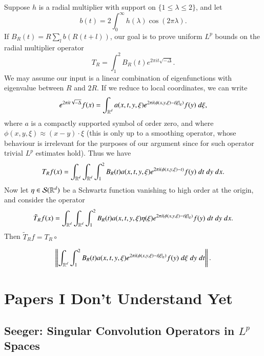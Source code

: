 Suppose $h$ is a radial multiplier with support on $\{ 1 \leq \lambda \leq 2 \}$, and let
%
\[ b(t) = 2 \int_0^\infty h(\lambda) \cos(2 \pi \lambda). \]
%
If $B_R(t) = R \sum_l b(R(t + l))$, our goal is to prove uniform $L^p$ bounds on the radial multiplier operator
%
\[ T_R = \int_1^2 B_R(t) e^{2 \pi i t \sqrt{-\Delta}}. \]
%
We may assume our input is a linear combination of eigenfunctions with eigenvalue between $R$ and $2R$. If we reduce to local coordinates, we can write
%
\[ e^{2 \pi i t \sqrt{-\Delta}} f(x) = \int_{\operatorname{\mathbb{R}}^d} a(x,t,y,\xi) e^{2 \pi i (\phi(x,y,\xi) - t |\xi|_g)} f(y)\; d\xi, \]
%
where $a$ is a compactly supported symbol of order zero, and where $\phi(x,y,\xi) \approx (x - y) \cdot \xi$ (this is only up to a smoothing operator, whose behaviour is irrelevant for the purposes of our argument since for such operator trivial $L^p$ estimates hold). Thus we have
%
\[ T_R f(x) = \int_{\operatorname{\mathbb{R}}^d} \int_{\operatorname{\mathbb{R}}^d} \int_1^2 B_R(t) a(x,t,y,\xi) e^{2 \pi i (\phi(x,y,\xi) - t)} f(y)\; dt\; dy\; dx. \]
%
Now let $\eta \in \mathcal{S}(\operatorname{\mathbb{R}}^d)$ be a Schwartz function vanishing to high order at the origin, and consider the operator
%
\[ \tilde{T}_R f(x) = \int_{\operatorname{\mathbb{R}}^d} \int_{\operatorname{\mathbb{R}}^d} \int_1^2 B_R(t) a(x,t,y,\xi) \eta( \xi ) e^{2 \pi i (\phi(x,y,\xi) - t |\xi|_g)} f(y)\; dt\; dy\; dx. \]
%
Then $\tilde{T}_R f = T_R \circ $

\[ \left\| \int_{\operatorname{\mathbb{R}}^d} \int_1^2 B_R(t) a(x,t,y,\xi) e^{2 \pi i (\phi(x,y,\xi) - t |\xi|_g)} f(y)\; d\xi\; dy\; dt \right\|. \]















\part{Papers I Don't Understand Yet}





\chapter{Seeger: Singular Convolution Operators in $L^p$ Spaces}


